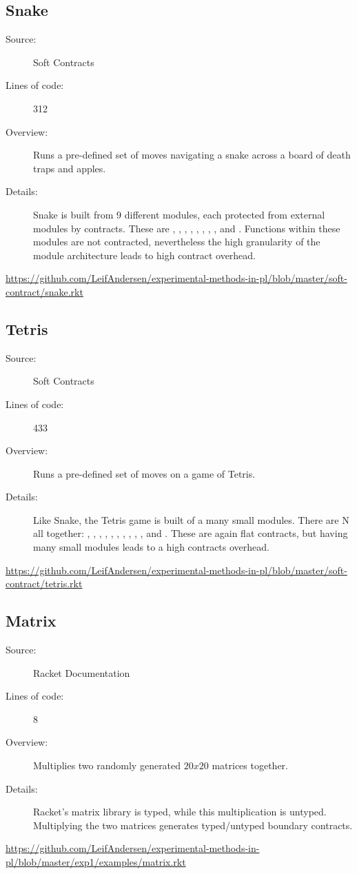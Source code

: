 \subsection*{Snake~\hrulefill}
\begin{description}
\item[Source:] Soft Contracts
\item[Lines of code:] 312
\item[Overview:]
  Runs a pre-defined set of moves navigating a snake across a board of death traps and apples.
\item[Details:] 
  Snake is built from 9 different modules, each protected from external modules by contracts.
  These are , , , , , , , , and .
  Functions within these modules are not contracted, nevertheless the high granularity of the module architecture leads to high contract overhead.
\end{description}
\url{https://github.com/LeifAndersen/experimental-methods-in-pl/blob/master/soft-contract/snake.rkt}

\subsection*{Tetris~\hrulefill}
\begin{description}
\item[Source:] Soft Contracts
\item[Lines of code:] 433
\item[Overview:]
  Runs a pre-defined set of moves on a game of Tetris.
\item[Details:] 
  Like Snake, the Tetris game is built of a many small modules.
  There are N all together: , , , , , , , , , , and .
  These are again flat contracts, but having many small modules leads to a high contracts overhead.
\end{description}
\url{https://github.com/LeifAndersen/experimental-methods-in-pl/blob/master/soft-contract/tetris.rkt}

\subsection*{Matrix~\hrulefill}
\begin{description}
\item[Source:] Racket Documentation
\item[Lines of code:] 8
\item[Overview:]
  Multiplies two randomly generated $20x20$ matrices together.
\item[Details:]
  Racket's matrix library is typed, while this multiplication is untyped.
  Multiplying the two matrices generates typed/untyped boundary contracts.
\end{description}
\url{https://github.com/LeifAndersen/experimental-methods-in-pl/blob/master/exp1/examples/matrix.rkt}

